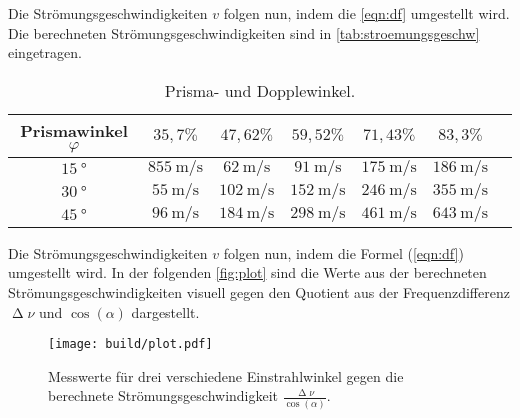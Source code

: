 \noindent
Die Strömungsgeschwindigkeiten $v$ folgen nun, indem die \autoref{eqn:df} umgestellt wird. Die berechneten Strömungsgeschwindigkeiten sind in \autoref{tab:stroemungsgeschw} eingetragen.
\begin{table}[H]
  \centering
  \caption{Prisma- und Dopplewinkel.}
  \label{tab:stroemungsgeschw}
  \begin{tabular}{c c c c c c c}
    \toprule
    Prismawinkel $\varphi$ & $35,7 \%$ & $47,62 \%$ & $59,52 \%$ & $71,43 \%$ & $83,3 \%$\\
    \midrule
    $\SI{15}{\degree}$ & $\SI{855}{\meter\per\second}$ & $\SI{62}{\meter\per\second}$ & $\SI{91}{\meter\per\second}$ & $\SI{175}{\meter\per\second}$ & $\SI{186}{\meter\per\second}$ \\
    $\SI{30}{\degree}$ & $\SI{55}{\meter\per\second}$ & $\SI{102}{\meter\per\second}$ & $\SI{152}{\meter\per\second}$ & $\SI{246}{\meter\per\second}$ & $\SI{355}{\meter\per\second}$ \\
    $\SI{45}{\degree}$ & $\SI{96}{\meter\per\second}$ & $\SI{184}{\meter\per\second}$ & $\SI{298}{\meter\per\second}$ & $\SI{461}{\meter\per\second}$ & $\SI{643}{\meter\per\second}$ \\
    \bottomrule
  \end{tabular}
\end{table}

\noindent
Die Strömungsgeschwindigkeiten $v$ folgen nun, indem die Formel (\ref{eqn:df}) umgestellt wird. In der folgenden \autoref{fig:plot} sind die Werte aus der 
berechneten Strömungsgeschwindigkeiten visuell gegen den Quotient aus der Frequenzdifferenz $\upDelta \nu$ und $\cos(\alpha)$ dargestellt.
\begin{figure}[H]
  \centering
  \texttt{[image: build/plot.pdf]}
  \caption{Messwerte für drei verschiedene Einstrahlwinkel gegen die berechnete Strömungsgeschwindigkeit $\frac{\upDelta\nu}{\cos(\alpha)}$.}
  \label{fig:plot}
\end{figure}

